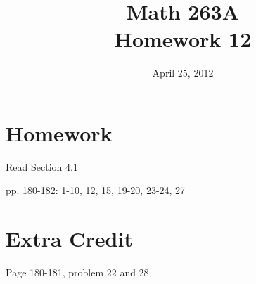 \documentclass[fleqn]{exam}
\title{Math 263A \\ Homework 12}
\date{April 25, 2012}
\begin{document}
\maketitle

\section{Homework}

\begin{itemize*}
  \item Read Section 4.1
  \item pp. 180-182: 1-10, 12, 15, 19-20, 23-24, 27
\end{itemize*}

\section{Extra Credit}
Page 180-181, problem 22 and 28

\ifprintanswers

\pagebreak
\end{document}
